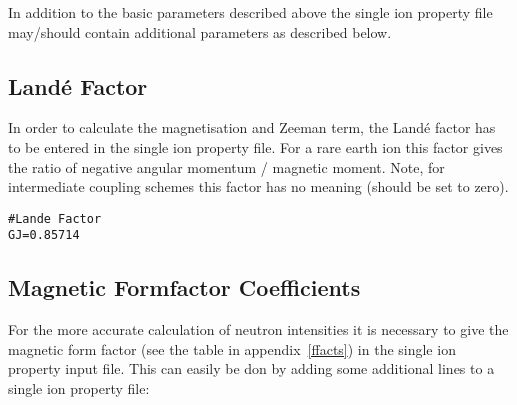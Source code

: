 In addition to the basic parameters described above the single ion property file 
may/should contain additional parameters as described below. 

\subsection{Land\'e Factor}

In order to calculate the magnetisation and Zeeman term, the Land\'e factor
has to be entered in the single ion property file. For a rare earth ion this
factor gives the ratio of negative angular momentum / magnetic moment.
Note, for intermediate coupling schemes this factor has no meaning (should be set to zero).

\begin{verbatim}
#Lande Factor
GJ=0.85714
\end{verbatim}


\subsection{Magnetic Formfactor Coefficients}

For the more accurate calculation of neutron intensities it is
necessary to give the magnetic form factor (see the table in appendix~\ref{ffacts})
in the single ion property input file. This can
easily be don by adding some additional lines to a single ion property file:

